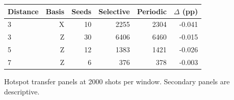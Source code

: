 \begin{center}\small
\begin{tabular}{lrrrrr}
\hline
Distance & Basis & Seeds & Selective & Periodic & $\Delta$ (pp) \\
\hline
3 & X & 10 & 2255 & 2304 & -0.041 \\
3 & Z & 30 & 6406 & 6460 & -0.015 \\
5 & Z & 12 & 1383 & 1421 & -0.026 \\
7 & Z & 6 & 376 & 378 & -0.003 \\
\hline\end{tabular}
\par\smallskip\parbox{0.93\linewidth}{\small Hotspot transfer panels at 2000 shots per window. Secondary panels are descriptive.}
\end{center}
